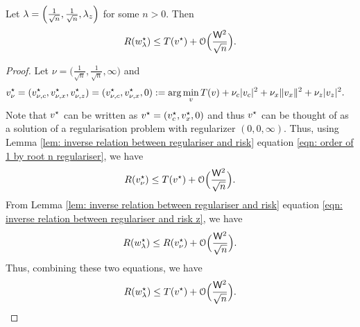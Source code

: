 \begin{cor}\label{cor: v star and w star infinity}
    Let $\lambda = \Big(\frac{1}{\sqrt{n}},\frac{1}{\sqrt{n}},\lambda_z\Big)$ for some $n > 0$. Then
    \begin{equation*}
        R(w^\star_{\lambda}) \leq T(v^\star) + \mathcal{O}\Big(\frac{\mathsf{W}^2}{\sqrt{n}}\Big).
    \end{equation*}
\end{cor}

\begin{proof}
    Let $\nu = \Big(\frac{1}{\sqrt{n}},\frac{1}{\sqrt{n}},\infty\Big)$ and
    \begin{equation*}
    \begin{aligned}
        v^\star_\nu &= (v^\star_{\nu,c} , v^\star_{\nu,x}, v^\star_{\nu,z}) = (v^\star_{\nu,c} , v^\star_{\nu,x}, 0) := \arg\min_v T(v) + \nu_c|v_c|^2 
        + \nu_x\|v_x\|^2 + \nu_z|v_z|^2.
    \end{aligned}
    \end{equation*}
Note that $v^\star$ can be written as $v^\star = (v^\star_c,v^\star_x,0)$ and thus $v^\star$ can be thought of as a solution of a regularisation problem with regularizer $(0,0,\infty)$. Thus, using Lemma \ref{lem: inverse relation between regulariser and risk} equation \eqref{eqn: order of 1 by root n regulariser}, we have
\begin{equation*}
    R(v^\star_\nu) \leq T(v^\star) + \mathcal{O}\Big(\frac{\mathsf{W}^2}{\sqrt{n}}\Big).
\end{equation*}
From Lemma \ref{lem: inverse relation between regulariser and risk} equation \eqref{eqn: inverse relation between regulariser and risk z}, we have
\begin{equation*}
    R(w^\star_{\lambda}) \leq R(v^\star_\nu) +  \mathcal{O}\Big(\frac{\mathsf{W}^2}{\sqrt{n}}\Big).
\end{equation*}
Thus, combining these two equations, we have
\begin{equation*}
     R(w^\star_{\lambda}) \leq T(v^\star) +  \mathcal{O}\Big(\frac{\mathsf{W}^2}{\sqrt{n}}\Big).
\end{equation*}
\end{proof}





